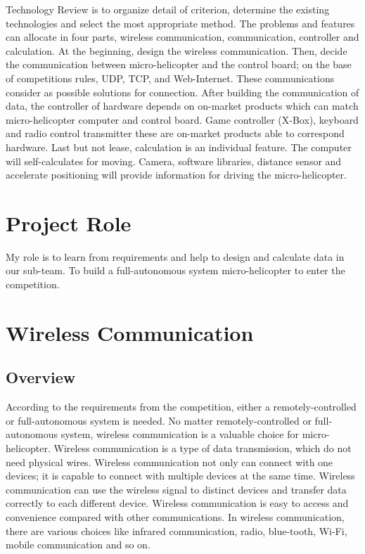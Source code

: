 \documentclass[letterpaper, 10, draftclsnofoot, onecolumn, compsoc]{IEEEtran}
\begin{document}
\normalsize{Technology Review is to organize detail of criterion, determine the existing technologies and select the most
appropriate method. The problems and features can allocate in four parts, wireless communication, communication, controller and
calculation. At the beginning, design the wireless communication.
Then, decide the communication between micro-helicopter and the control board;
on the base of competitions rules, UDP, TCP, and Web-Internet. These communications consider as possible solutions for connection.
After building the communication of data, the controller of hardware depends on on-market products which can match micro-helicopter computer and
control board. Game controller (X-Box), keyboard and radio control transmitter these are on-market products able
to correspond hardware. Last but not lease, calculation is an individual feature. The computer will self-calculates for moving.
Camera, software libraries, distance sensor and accelerate positioning will provide information for driving the micro-helicopter.

\let \newpage \snewpage
\vfill
\break %


\section{Project Role}

My role is to learn from requirements and help to design and calculate data in our sub-team.
To build a full-autonomous system micro-helicopter to enter the competition.

\section{Wireless Communication}

\subsection{Overview}

According to the requirements from the competition, either a remotely-controlled or full-autonomous system is needed.
No matter remotely-controlled or full-autonomous system,
wireless communication is a valuable choice for micro-helicopter.
Wireless communication is a type of data transmission, which do not need physical wires.
Wireless communication not only can connect with one devices;
it is capable to connect with multiple devices at the same time.
Wireless communication can use the wireless signal to distinct devices
and transfer data correctly to each different device.
Wireless communication is easy to access and convenience compared with other communications.
In wireless communication, there are various choices like
infrared communication, radio, blue-tooth, Wi-Fi, mobile communication and so on.

}
\end{document}
